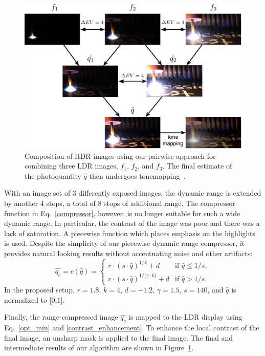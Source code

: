 \begin{figure}
\center
  \includegraphics[width=13cm]{ch3/diagrams/3_composite_LUT.pdf}
  \caption{Composition of HDR images using our pairwise approach for
    combining three LDR images, $f_1$, $f_2$, and $f_3$. The final
    estimate of the photoquantity $\hat{q}$ then undergoes
    tonemapping~\cite{mann2012realtime}.  }
  \label{composite3}
\end{figure}
With an image set of 3 differently exposed images, the dynamic range is extended by another 4 
stops, a total of 8 stops of additional range.  The compressor function in Eq.~\ref{compressor},
however, is no longer suitable for such a wide dynamic
range. In particular, the contrast of the image was poor and
there was a lack of saturation.  A piecewise function which places
emphasis on the highlights is used.  Despite the simplicity of our
piecewise dynamic range compressor, it provides natural looking
results without accentuating noise and other artifacts: %
\begin{equation}\label{compressor_new}
  \hat{q_c}=c(\hat{q})=
\begin{cases}
  r\cdot (s \cdot \hat{q})^{1/k}+d& \text{if $\hat{q} \le 1/s$},	\\
  r\cdot (s \cdot \hat{q})^{1/({\gamma \cdot k)}}+d& \text{if $\hat{q}
    > 1/s$}.
\end{cases}
\end{equation}
In the proposed setup, $r=1.8$, $k=4$, $d=-1.2$,
$\gamma=1.5$, $s=140$, and $\hat{q}$ is normalized to [0,1].

Finally, the range-compressed image $\hat{q_c}$ is mapped to the LDR display using 
Eq.~\ref{opt_min} and \ref{contrast_enhancement}. To enhance the local contrast of the final image, 
an unsharp mask is applied to the final image. The final and intermediate results of our algorithm are 
shown in Figure~\ref{composite3}.



